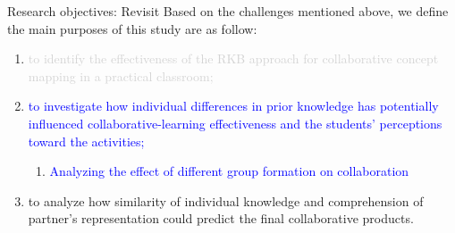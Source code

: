 \begin{frame}{Research objectives: Revisit}
    Based on the challenges mentioned above, we define the main purposes of this study are as follow: 
    \begin{enumerate}[A]
        \item \textcolor{lightgray}{to identify the effectiveness of the RKB approach for collaborative concept mapping in a practical classroom;}
        
        \item \textcolor{blue}{to investigate how individual differences in prior knowledge has potentially influenced collaborative-learning effectiveness and the students' perceptions toward the activities;} 
        \begin{enumerate}[3]
            \item \textcolor{blue}{Analyzing the effect of different group formation on collaboration}
        \end{enumerate}
        
        \item to analyze how similarity of individual knowledge and comprehension  of partner's representation could predict the final collaborative products.
    \end{enumerate} 
\end{frame}


